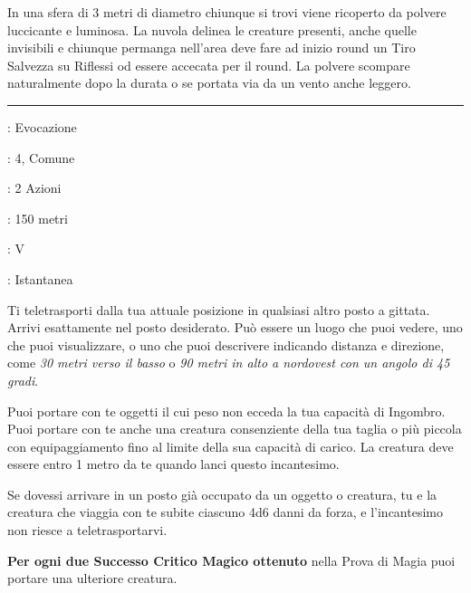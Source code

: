 \begin{multicols}{2}
In una sfera di 3 metri di diametro chiunque si trovi viene ricoperto da polvere luccicante e luminosa. La nuvola delinea le creature presenti, anche quelle invisibili e chiunque permanga nell'area deve fare ad inizio round un Tiro Salvezza su Riflessi od essere accecata per il round. La polvere scompare naturalmente dopo la durata o se portata via da un vento anche leggero.

\smallskip\noindent\rule{\linewidth}{2pt} \hypertarget{Porta Dimensionale}{}\medskip{}
\noindent
\begin{description}[noitemsep, topsep=0pt, parsep=0pt, partopsep=0pt, leftmargin=0cm, labelwidth=2.8cm]
	\item[\textbf{Lista di Magia}]: Evocazione
	\item[\textbf{Livello}]: 4, Comune
	\item[\textbf{T. di Lancio}]: 2 Azioni
	\item[\textbf{Gittata}]: 150 metri
	\item[\textbf{Componenti}]: V
	\item[\textbf{Durata}]: Istantanea
\end{description}

Ti teletrasporti dalla tua attuale posizione in qualsiasi altro posto a gittata. Arrivi esattamente nel posto desiderato. Può essere un luogo che puoi vedere, uno che puoi visualizzare, o uno che puoi descrivere indicando distanza e direzione, come \emph{30 metri verso il basso} o \emph{90 metri in alto a nordovest con un angolo di 45 gradi}.

Puoi portare con te oggetti il cui peso non ecceda la tua capacità di Ingombro. Puoi portare con te anche una creatura consenziente della tua taglia o più piccola con equipaggiamento fino al limite della sua capacità di carico. La creatura deve essere entro 1 metro da te quando lanci questo incantesimo.

Se dovessi arrivare in un posto già occupato da un oggetto o creatura, tu e la creatura che viaggia con te subite ciascuno 4d6 danni da forza, e l'incantesimo non riesce a teletrasportarvi.

\textbf{Per ogni due Successo Critico Magico ottenuto} nella Prova di Magia puoi portare una ulteriore creatura.


\end{multicols}
